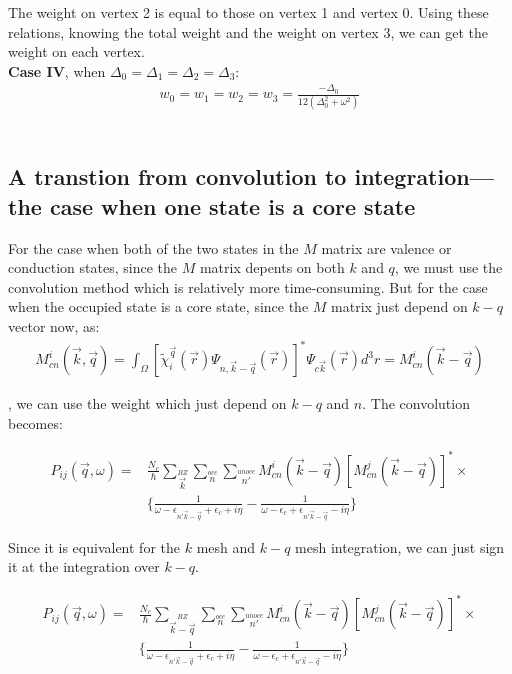 \documentclass[10pt]{article}
\begin{document}
The weight on vertex 2 is equal to those on vertex 1 and vertex 0. Using these relations, knowing the total weight and the weight on vertex 3, we can get the weight on each vertex. \\

\textbf{Case IV}, when $\Delta_0=\Delta_1=\Delta_2=\Delta_3$:\\

\begin{eqnarray}\label{wtti4az}
w_0=w_1=w_2=w_3=\frac{-\Delta_0}{12(\Delta_0^2+\omega^2)}
\end{eqnarray}\\

\subsection{A transtion from convolution to integration---the case when one state is a core state}

For the case when both of the two states in the $M$ matrix are valence or conduction states, since the $M$ matrix depents on both $k$ and $q$, we must use the convolution method which is relatively more time-consuming. But for the case when the occupied state is a core state, since the $M$ matrix just depend on $k-q$ vector now, as:\\

\begin{eqnarray}\label{matcn}
M_{cn}^i(\vec{k},\vec{q})=\int_{\Omega}[\tilde{\chi}_i^{\vec{q}}(\vec{r})\Psi_{n,\vec{k}-\vec{q}}(\vec{r})]^{*}\Psi_{c\vec{k}}(\vec{r})d^3 r=M_{cn}^i(\vec{k}-\vec{q})
\end{eqnarray}

, we can use the weight which just depend on $k-q$ and $n$. The convolution becomes:

\begin{eqnarray}\label{matpkq}
P_{ij}(\vec{q},\omega)=&\frac{N_c}{\hbar}\sum\limits_{\vec{k}}\limits^{BZ}\sum\limits_{n}\limits^{occ}\sum\limits_{n'}\limits^{unocc}M_{cn}^i(\vec{k}-\vec{q})[M_{cn}^j(\vec{k}-\vec{q})]^{*}\times \nonumber \\
& \{\frac{1}{\omega-\epsilon_{n'\vec{k}-\vec{q}}+\epsilon_{c}+i\eta}-\frac{1}{\omega-\epsilon_{c}+\epsilon_{n'\vec{k}-\vec{q}}-i\eta}\}
\end{eqnarray}
 
Since it is equivalent for the $k$ mesh and $k-q$ mesh integration, we can just sign it at the integration over $k-q$.  

\begin{eqnarray}\label{matpk}
P_{ij}(\vec{q},\omega)=&\frac{N_c}{\hbar}\sum\limits_{\vec{k}-\vec{q}}\limits^{BZ}\sum\limits_{n}\limits^{occ}\sum\limits_{n'}\limits^{unocc}M_{cn}^i(\vec{k}-\vec{q})[M_{cn}^j(\vec{k}-\vec{q})]^{*}\times \nonumber \\ &
\{\frac{1}{\omega-\epsilon_{n'\vec{k}-\vec{q}}+\epsilon_{c}+i\eta}-\frac{1}{\omega-\epsilon_{c}+\epsilon_{n'\vec{k}-\vec{q}}-i\eta}\}
\end{eqnarray}\\
\end{document}
